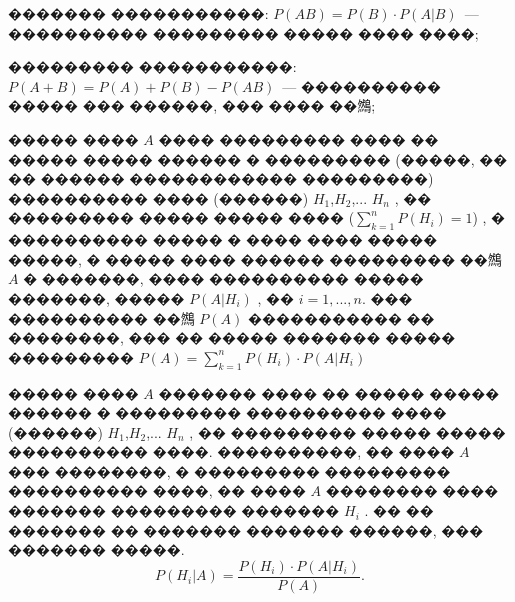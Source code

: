 \documentclass[a4paper,12pt]{article}
\begin{document}
������� �����������: $P(AB) = P(B)\cdot P(A|B)$~--- ���������� ��������� ����� ���� ����;

��������� �����������: $P(A+B) = P(A)+P(B)-P(AB)$~--- ���������� ����� ��� ������, ��� ���� ��䳿;

����� ����  $A$
  ���� ��������� ���� �� ����� ����� ������ � ��������� (�����, �� �� ������ ������������ ���������) ���������� ���� (������)  $H_{1}$,$H_{2}$,... $H_{n}$
 , �� ��������� ����� ����� ���� ($\sum\limits_{k=1}^{n}P(H_{i})=1$)
 , � ���������� ����� � ���� ���� ����� �����, � ����� ���� ������ ��������� ��䳿  $A$
  � �������, ���� ���������� ����� �������, �����  $P(A|H_{i})$
 , ��  $i=1,...,n$.
  ��� ���������� ��䳿  $P(A)$
  ����������� �� ��������, ��� �� ����� ������� ����� ��������� $P(A) = \sum\limits_{k=1}^{n}P(H_{i})\cdot P(A|H_{i})$

����� ����  $A$
  ������� ���� �� ����� ����� ������ � ��������� ���������� ���� (������)  $H_{1}$,$H_{2}$,... $H_{n}$
 , �� ��������� ����� ����� ���������� ����. ����������, �� ����   $A$
  ��� ��������, � ��������� ��������� ���������� ����, �� ����   $A$
  �������� ���� ������� ��������� �������  $H_{i}$
 . �� �� ������� �� ������� ������� ������, ��� ������� �����.
 $$P(H_{i}|A)=\frac{P(H_{i})\cdot P(A|H_{i})}{P(A)}.$$

\medskip\medskip\medskip
\end{document}
